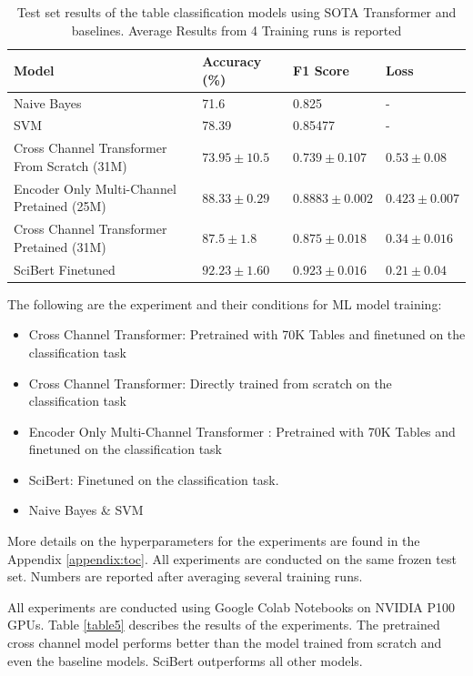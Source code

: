 \begin{table}[h]
    \label{table\arabic{tablecounter}}
    \centering
    \begin{tabular}{|p{4cm}|p{3cm}|p{3cm}|p{3cm}|}
    \hline
        \textbf{Model} & \textbf{Accuracy} (\%) & \textbf{F1 Score}  & \textbf{Loss} \\ \hline
        Naive Bayes & 71.6 & 0.825 & - \\ \hline
        SVM  & 78.39 & 0.85477 & - \\ \hline
        Cross Channel Transformer From Scratch (31M) & $73.95 \pm 10.5 $ & $0.739 \pm 0.107$ & $0.53 \pm 0.08$ \\ \hline
        Encoder Only Multi-Channel Pretained (25M) & $88.33 \pm 0.29$ & $0.8883 \pm 0.002$ & $0.423 \pm 0.007$ \\ \hline
        Cross Channel Transformer Pretained (31M) & $87.5 \pm 1.8$ & $0.875 \pm 0.018$ & $0.34 \pm 0.016$ \\ \hline
        SciBert Finetuned & $92.23 \pm 1.60$ & $0.923 \pm 0.016$ & $0.21 \pm 0.04$ \\ \hline
    \end{tabular}
    \caption{\label{tablecounter} Test set results of the table classification models using SOTA Transformer and baselines. Average Results from 4 Training runs is reported}
\end{table}
The following are the experiment and their conditions for ML model training:
\begin{itemize}
    \item Cross Channel Transformer: Pretrained with 70K Tables and finetuned on the classification task
    \item Cross Channel Transformer: Directly trained from scratch on the classification task 
    \item Encoder Only Multi-Channel Transformer : Pretrained with 70K Tables and finetuned on the classification task
    \item SciBert: Finetuned on the classification task.
    \item Naive Bayes \& SVM
\end{itemize}
More details on the hyperparameters for the experiments are found in the Appendix \ref{appendix:toc}. All experiments are conducted on the same frozen test set. Numbers are reported after averaging several training runs.

All experiments are conducted using Google Colab Notebooks on NVIDIA P100 GPUs. Table \ref{table5} describes the results of the experiments. The pretrained cross channel model performs better than the model trained from scratch and even the baseline models. SciBert outperforms all other models. 

